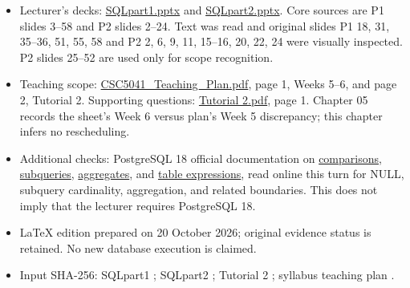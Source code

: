 \begin{itemize}
\tightlist
\item
  Lecturer's decks: \href{../../../slides/SQLpart1.pptx}{SQLpart1.pptx} and \href{../../../slides/SQLpart2.pptx}{SQLpart2.pptx}. Core sources are P1 slides 3--58 and P2 slides 2--24. Text was read and original slides P1 18, 31, 35--36, 51, 55, 58 and P2 2, 6, 9, 11, 15--16, 20, 22, 24 were visually inspected. P2 slides 25--52 are used only for scope recognition.
\item
  Teaching scope: \href{../../../syllabus/CSC5041_Teaching_Plan.pdf}{CSC5041\_Teaching\_Plan.pdf}, page 1, Weeks 5--6, and page 2, Tutorial 2. Supporting questions: \href{../../../slides/Tutorial\%202.pdf}{Tutorial 2.pdf}, page 1. Chapter 05 records the sheet's Week 6 versus plan's Week 5 discrepancy; this chapter infers no rescheduling.
\item
  Additional checks: PostgreSQL 18 official documentation on \href{https://www.postgresql.org/docs/18/functions-comparison.html}{comparisons}, \href{https://www.postgresql.org/docs/18/functions-subquery.html}{subqueries}, \href{https://www.postgresql.org/docs/18/functions-aggregate.html}{aggregates}, and \href{https://www.postgresql.org/docs/18/queries-table-expressions.html}{table expressions}, read online this turn for NULL, subquery cardinality, aggregation, and related boundaries. This does not imply that the lecturer requires PostgreSQL 18.
\item
  LaTeX edition prepared on 20 October 2026; original evidence status is retained. No new database execution is claimed.
\item
  Input SHA-256: SQLpart1 \texttt{}; SQLpart2 \texttt{}; Tutorial 2 \texttt{}; syllabus teaching plan \texttt{}.
\end{itemize}
